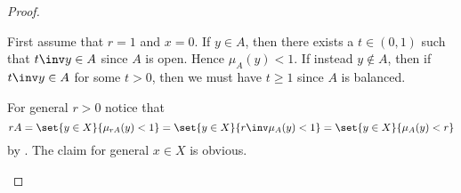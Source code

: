 \documentclass[article, a4paper, 11pt, oneside]{memoir}
\numberwithin{equation}{chapter}
\newcommand{\calB}{\mathcal{B}}
\begin{document}
\begin{proof}
\begin{proofsec}
    \item[Proof of \subcref{enum:Minkowski-functional-balls}]
    First assume that $r = 1$ and $x = 0$. If $y \in A$, then there exists a $t \in (0,1)$ such that $t\inv y \in A$ since $A$ is open. Hence $\mu_A(y) < 1$. If instead $y \not\in A$, then if $t\inv y \in A$ for some $t > 0$, then we must have $t \geq 1$ since $A$ is balanced.
    
    For general $r > 0$ notice that
    \begin{equation*}
        rA
            = \set{y \in X}{\mu_{rA}(y) < 1}
            = \set{y \in X}{r\inv \mu_A(y) < 1}
            = \set{y \in X}{\mu_A(y) < r}
    \end{equation*}
    by . The claim for general $x \in X$ is obvious.
\end{proofsec}
\end{proof}




\end{document}
